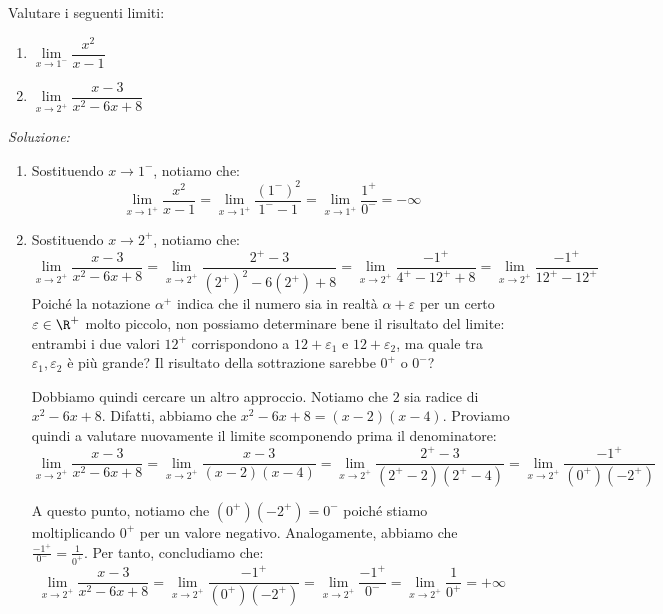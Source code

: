 \documentclass[a4paper, 12pt]{report}
\begin{document}
    \begin{framedprob}{}
        Valutare i seguenti limiti:
        \begin{enumerate}
            \item $\lim\limits_{x \to 1^-} \dfrac{x^2}{x-1}$
            \item $\lim\limits_{x \to 2^+} \dfrac{x-3}{x^2-6x+8}$
        \end{enumerate}
    \end{framedprob}

    \textit{Soluzione:}

    \begin{enumerate}
        \item Sostituendo $x \to 1^-$, notiamo che:
        \[\lim_{x \to 1^+} \dfrac{x^2}{x-1} = \lim_{x \to 1^+} \dfrac{(1^-)^2}{1^--1} = \lim_{x \to 1^+} \dfrac{1^+}{0^-} = -\infty\]

        \item Sostituendo $x \to 2^+$, notiamo che:
        \[\lim\limits_{x \to 2^+} \dfrac{x-3}{x^2-6x+8} = \lim\limits_{x \to 2^+} \dfrac{2^+-3}{(2^+)^2-6(2^+)+8} = \lim\limits_{x \to 2^+} \dfrac{-1^+}{4^+-12^++8} = \lim\limits_{x \to 2^+} \dfrac{-1^+}{12^+-12^+}\]
        Poiché la notazione $\alpha^+$ indica che il numero sia in realtà $\alpha + \varepsilon$ per un certo $\varepsilon \in \R^+$ molto piccolo, non possiamo determinare bene il risultato del limite: entrambi i due valori $12^+$ corrispondono a $12+\varepsilon_1$ e $12+\varepsilon_2$, ma quale tra $\varepsilon_1, \varepsilon_2$ è più grande? Il risultato della sottrazione sarebbe $0^+$ o $0^-$?

        Dobbiamo quindi cercare un altro approccio. Notiamo che $2$ sia radice di $x^2-6x+8$. Difatti, abbiamo che $x^2-6x+8 = (x-2)(x-4)$. Proviamo quindi a valutare nuovamente il limite scomponendo prima il denominatore:
        \[\lim\limits_{x \to 2^+} \dfrac{x-3}{x^2-6x+8} = \lim\limits_{x \to 2^+} \dfrac{x-3}{(x-2)(x-4)} = \lim_{x \to 2^+} \frac{2^+-3}{(2^+-2)(2^+-4)} = \lim_{x \to 2^+} \frac{-1^+}{(0^+)(-2^+)}\]

        A questo punto, notiamo che $(0^+)(-2^+) = 0^-$ poiché stiamo moltiplicando $0^+$ per un valore negativo. Analogamente, abbiamo che $\frac{-1^+}{0^-} = \frac{1}{0^+}$. Per tanto, concludiamo che:
        \[\lim\limits_{x \to 2^+} \dfrac{x-3}{x^2-6x+8} = \lim_{x \to 2^+} \frac{-1^+}{(0^+)(-2^+)} = \lim_{x \to 2^+} \frac{-1^+}{0^-} = \lim_{x \to 2^+} \frac{1}{0^+} = +\infty\]

    \end{enumerate}
\end{document}
